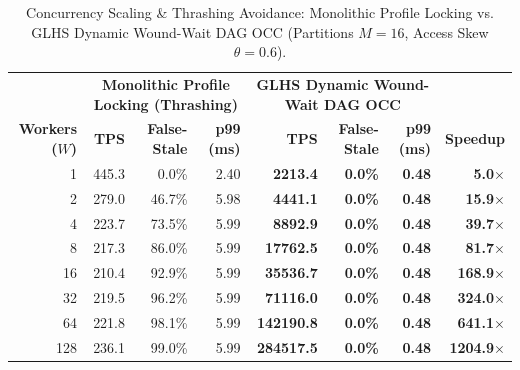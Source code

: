 \begin{table}[t]
\centering
\small
\caption{Concurrency Scaling & Thrashing Avoidance: Monolithic Profile Locking vs. GLHS Dynamic Wound-Wait DAG OCC (Partitions $M=16$, Access Skew $\theta=0.6$).}
\label{tab:glhs_concurrency_scaling}
\begin{tabular}{r|rrr|rrr|r}
\toprule
 & \multicolumn{3}{c|}{\textbf{Monolithic Profile Locking (Thrashing)}} & \multicolumn{3}{c|}{\textbf{GLHS Dynamic Wound-Wait DAG OCC}} & \\
\textbf{Workers ($W$)} & \textbf{TPS} & \textbf{False-Stale} & \textbf{p99 (ms)} & \textbf{TPS} & \textbf{False-Stale} & \textbf{p99 (ms)} & \textbf{Speedup} \\
\midrule
  1 &   445.3 &   0.0\% &   2.40 & \textbf{ 2213.4} & \textbf{ 0.0\%} & \textbf{ 0.48} & \textbf{ 5.0$\times$} \\
  2 &   279.0 &  46.7\% &   5.98 & \textbf{ 4441.1} & \textbf{ 0.0\%} & \textbf{ 0.48} & \textbf{15.9$\times$} \\
  4 &   223.7 &  73.5\% &   5.99 & \textbf{ 8892.9} & \textbf{ 0.0\%} & \textbf{ 0.48} & \textbf{39.7$\times$} \\
  8 &   217.3 &  86.0\% &   5.99 & \textbf{17762.5} & \textbf{ 0.0\%} & \textbf{ 0.48} & \textbf{81.7$\times$} \\
 16 &   210.4 &  92.9\% &   5.99 & \textbf{35536.7} & \textbf{ 0.0\%} & \textbf{ 0.48} & \textbf{168.9$\times$} \\
 32 &   219.5 &  96.2\% &   5.99 & \textbf{71116.0} & \textbf{ 0.0\%} & \textbf{ 0.48} & \textbf{324.0$\times$} \\
 64 &   221.8 &  98.1\% &   5.99 & \textbf{142190.8} & \textbf{ 0.0\%} & \textbf{ 0.48} & \textbf{641.1$\times$} \\
128 &   236.1 &  99.0\% &   5.99 & \textbf{284517.5} & \textbf{ 0.0\%} & \textbf{ 0.48} & \textbf{1204.9$\times$} \\
\bottomrule
\end{tabular}
\end{table}

